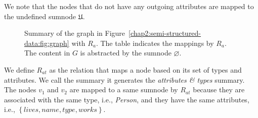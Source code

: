 \begin{remark}
We note that the nodes that do not have any outgoing attributes are mapped to the undefined sumnode $\mathfrak{U}$.
\end{remark}

\begin{figure}
	\centering
	\begin{minipage}{.75\textwidth}
		\resizebox{\textwidth}{!}{
			
		}
	\end{minipage}
	\quad
	\begin{minipage}[h]{.2\textwidth}
		\centering
		\caption*{$R_a\left(V, \mathcal{W}\right)$}
	\end{minipage}
	\caption{Summary of the graph in Figure~\ref{chap2:semi-structured-data:fig:graph} with $R_a$. The table indicates the mappings by $R_a$. The content in $G$ is abstracted by the sumnode $\varnothing$.}
	\label{chap4:summary:fig:attributes-summary}
\end{figure}
\vspace{.5cm}


We define $R_{at}$ as the relation that maps a node based on its set of \gls{types} and \gls{attributes}. We call the summary it generates the \emph{attributes \& types} summary.
The nodes $v_1$ and $v_2$ are mapped to a same sumnode by $R_{at}$ because they are associated with the same type, i.e., \emph{Person}, and they have the same attributes, i.e., $\left\lbrace lives, name, type, works \right\rbrace$.

